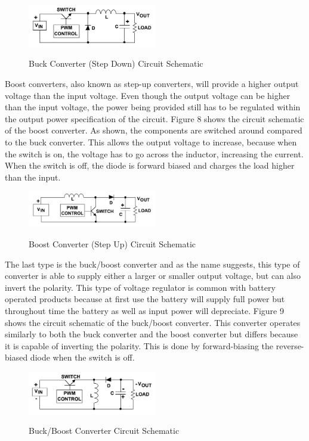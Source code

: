 \begin{figure}[H]
    \caption{Buck Converter (Step Down) Circuit Schematic}
    \centering
    \includegraphics[width=0.5\textwidth]{images/Buck_Converter.png}
    \label{fig:buck-converter-schematic}
\end{figure}
Boost converters, also known as step-up converters, will provide a higher output voltage than the input voltage. Even though the output voltage can be higher than the input voltage, the power being provided still has to be regulated within the output power specification of the circuit. Figure 8 shows the circuit schematic of the boost converter. As shown, the components are switched around compared to the buck converter. This allows the output voltage to increase, because when the switch is on, the voltage has to go across the inductor, increasing the current. When the switch is off, the diode is forward biased and charges the load higher than the input.\par
\begin{figure}[H]
    \caption{Boost Converter (Step Up) Circuit Schematic}
    \centering
    \includegraphics[width=0.5\textwidth]{images/Boost_Converter.png}
    \label{fig:boost-converter-schematic}
\end{figure}
The last type is the buck/boost converter and as the name suggests, this type of converter is able to supply either a larger or smaller output voltage, but can also invert the polarity. This type of voltage regulator is common with battery operated products because at first use the battery will supply full power but throughout time the battery as well as input power will depreciate. Figure 9 shows the circuit schematic of the buck/boost converter. This converter operates similarly to both the buck converter and the boost converter but differs because it is capable of inverting the polarity. This is done by forward-biasing the reverse-biased diode when the switch is off. \par
\begin{figure}[H]
    \caption{Buck/Boost Converter Circuit Schematic}
    \centering
    \includegraphics[width=0.5\textwidth]{images/Buck_Boost_Converter.png}
    \label{fig:buck-boost-schematic}
\end{figure}
